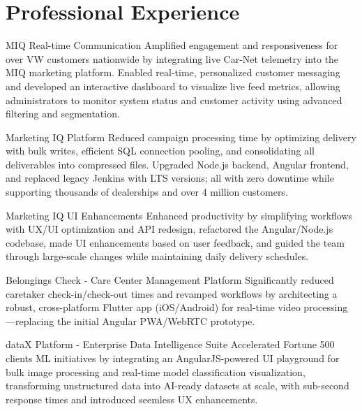 \section{Professional Experience}

\begin{sectionContainer}
	{MIQ Real-time Communication} {Amplified engagement and responsiveness} {for over VW customers nationwide by integrating live Car-Net telemetry into the MIQ marketing platform. Enabled real-time, personalized customer messaging and developed an interactive dashboard to visualize live feed metrics, allowing administrators to monitor system status and customer activity using advanced filtering and segmentation.}
\end{sectionContainer}

\begin{sectionContainer}
	{Marketing IQ Platform} {Reduced campaign processing time} {by optimizing delivery with bulk writes, efficient SQL connection pooling, and consolidating all deliverables into compressed files. Upgraded Node.js backend, Angular frontend, and replaced legacy Jenkins with LTS versions; all with zero downtime while supporting thousands of dealerships and over 4 million customers.}
\end{sectionContainer}

\begin{sectionContainer}
	{Marketing IQ UI Enhancements} {Enhanced productivity} {by simplifying workflows with UX/UI optimization and API redesign, refactored the Angular/Node.js codebase, made UI enhancements based on user feedback, and guided the team through large-scale changes while maintaining daily delivery schedules.}
\end{sectionContainer}


\begin{sectionContainer}
	{Belongings Check - Care Center Management Platform} {Significantly reduced caretaker check-in/check-out times} {and revamped workflows by architecting a robust, cross-platform Flutter app (iOS/Android) for real-time video processing—replacing the initial Angular PWA/WebRTC prototype.}
\end{sectionContainer}

\begin{sectionContainer}
	{dataX Platform - Enterprise Data Intelligence Suite} {Accelerated Fortune 500 clients ML initiatives} {by integrating an AngularJS-powered UI playground for bulk image processing and real-time model classification visualization, transforming unstructured data into AI-ready datasets at scale, with sub-second response times and introduced seemless UX enhancements.}
\end{sectionContainer}

